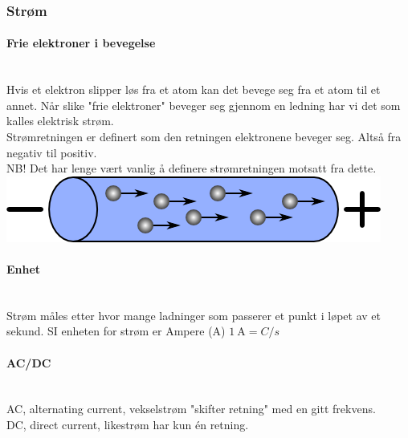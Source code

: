 \subsubsection{Strøm}
\paragraph{Frie elektroner i bevegelse} \mbox{} \\
Hvis et elektron slipper løs fra et atom kan det bevege seg fra et atom til et annet.
Når slike "frie elektroner" beveger seg gjennom en ledning
har vi det som kalles elektrisk strøm.
\\

Strømretningen er definert som den retningen elektronene beveger seg.
Altså fra negativ til positiv.\\
NB! Det har lenge vært vanlig å definere strømretningen motsatt fra dette.
\\
\includegraphics[scale=0.5]{./img/current}

\paragraph{Enhet} \mbox{} \\
Strøm måles etter hvor mange ladninger som passerer et punkt
i løpet av et sekund.
SI enheten for strøm er Ampere (A) \hfill $\SI{1}{\ampere} = C/s$

\paragraph{AC/DC} \mbox{} \\
AC, alternating current, vekselstrøm "skifter retning" med en gitt frekvens.\\
DC, direct current, likestrøm har kun én retning.

